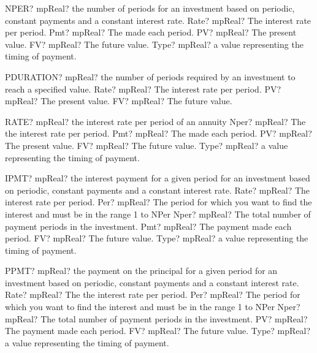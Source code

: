 \documentclass[12pt,a4paper,openany]{book}
\begin{document}
\begin{mpFunctionsExtract}
\mpWorksheetFunctionFiveNotImplemented
{NPER? mpReal? the number of periods for an investment based on periodic, constant payments and a constant interest rate.}
{Rate? mpReal? The interest rate per period.}
{Pmt? mpReal? The made each period.}
{PV? mpReal? The present value.}
{FV? mpReal? The future value.}
{Type? mpReal? a value representing the timing of payment.}
\end{mpFunctionsExtract}

\begin{mpFunctionsExtract}
\mpWorksheetFunctionThreeNotImplemented
{PDURATION? mpReal?  the number of periods required by an investment to reach a specified value.}
{Rate? mpReal? The interest rate per period.}
{PV? mpReal? The present value.}
{FV? mpReal? The future value.}
\end{mpFunctionsExtract}

\begin{mpFunctionsExtract}
\mpWorksheetFunctionFiveNotImplemented
{RATE? mpReal? the interest rate per period of an annuity}
{Nper? mpReal? The the interest rate per period.}
{Pmt? mpReal? The made each period.}
{PV? mpReal? The present value.}
{FV? mpReal? The future value.}
{Type? mpReal? a value representing the timing of payment.}
\end{mpFunctionsExtract}

\begin{mpFunctionsExtract}
\mpWorksheetFunctionSixNotImplemented
{IPMT? mpReal? the interest payment for a given period for an investment based on periodic, constant payments and a constant interest rate.}
{Rate? mpReal? The interest rate per period.}
{Per? mpReal? The period for which you want to find the interest and must be in the range 1 to NPer}
{Nper? mpReal? The total number of payment periods in the investment.}
{Pmt? mpReal? The payment made each period.}
{FV? mpReal? The future value.}
{Type? mpReal? a value representing the timing of payment.}
\end{mpFunctionsExtract}

\begin{mpFunctionsExtract}
\mpWorksheetFunctionSixNotImplemented
{PPMT? mpReal? the payment on the principal for a given period for an investment based on periodic, constant payments and a constant interest rate.}
{Rate? mpReal? The the interest rate per period.}
{Per? mpReal? The period for which you want to find the interest and must be in the range 1 to NPer}
{Nper? mpReal? The total number of payment periods in the investment.}
{PV? mpReal? The payment made each period.}
{FV? mpReal? The future value.}
{Type? mpReal? a value representing the timing of payment.}
\end{mpFunctionsExtract}
\end{document}
